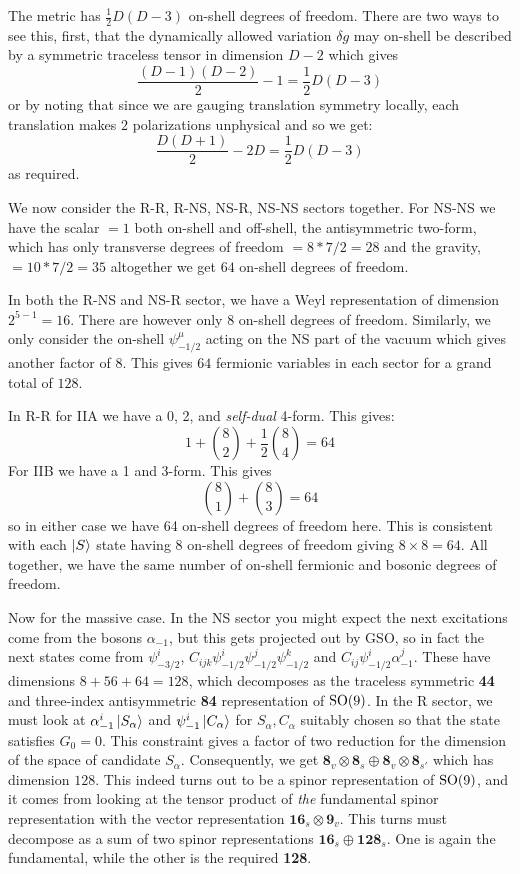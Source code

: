 \documentclass[11pt, class=article, crop=false]{standalone}
\begin{document}
\begin{enumerate}
	The metric has $\frac12 D (D-3)$ on-shell degrees of freedom. There are two ways to see this, first, that the dynamically allowed variation $\delta g$ may on-shell be described by a symmetric traceless tensor in dimension $D-2$ which gives
	\[
		\frac{(D-1)(D-2)}{2} - 1 = \frac12 D (D-3)
	\]
	or by noting that since we are gauging translation symmetry locally, each translation makes $2$ polarizations unphysical and so we get:
	\[
		\frac{D(D+1)}{2} - 2 D = \frac12 D (D-3)
	\]
	as required.
	
	We now consider the R-R, R-NS, NS-R, NS-NS sectors together. For NS-NS we have the scalar $=1$ both on-shell and off-shell, the antisymmetric two-form, which has only transverse degrees of freedom $=8 * 7/2 = 28$ and the gravity, $= 10 * 7/2 = 35$ altogether we get $64$ on-shell degrees of freedom.

	In both the R-NS and NS-R sector, we have a Weyl representation of dimension $2^{5-1} = 16$. There are however only $8$ on-shell degrees of freedom. Similarly, we only consider the on-shell $\psi^\mu_{-1/2}$ acting on the NS part of the vacuum which gives another factor of $8$. This gives $64$ fermionic variables in each sector for a grand total of $128$.

	In R-R for IIA we have a 0, 2, and \emph{self-dual} 4-form. This gives:
	\[
	1 + {8 \choose 2} + \frac12 {8 \choose 4} = 64
	\]
	For IIB we have a 1 and 3-form. This gives
	\[
	{8 \choose 1} + {8 \choose 3} = 64
	\]
	so in either case we have 64 on-shell degrees of freedom here. This is consistent with each $\ket{S}$ state having $8$ on-shell degrees of freedom giving $8 \times 8 = 64$. All together, we have the same number of on-shell fermionic and bosonic degrees of freedom. 

	Now for the massive case. In the NS sector you might expect the next excitations come from the bosons $\alpha_{-1}$, but this gets projected out by GSO, so in fact the next states come from $\psi_{-3/2}^i$, $C_{ijk} \psi_{-1/2}^i \psi_{-1/2}^j \psi_{-1/2}^k$ and $C_{ij} \psi_{-1/2}^i \alpha_{-1}^j$. These have dimensions $8+56+64 = 128$, which decomposes as the traceless symmetric \textbf{44} and three-index antisymmetric \textbf{84} representation of $\mathrm{SO}(9)$. In the R sector, we must look at $\alpha_{-1}^i \ket{S_\alpha}$ and $\psi_{-1}^i \ket{C_\alpha}$ for $S_\alpha, C_\alpha$ suitably chosen so that the state satisfies $G_0 = 0$. This constraint gives a factor of two reduction for the dimension of the space of candidate $S_\alpha$. Consequently, we get $\mathbf{8}_v \otimes \mathbf{8}_s \oplus \mathbf{8}_v \otimes \mathbf{8}_{s'}$ which has dimension $128$. This indeed turns out to be a spinor representation of $\mathrm{SO}(9)$, and it comes from looking at the tensor product of \emph{the} fundamental spinor representation with the vector representation $\mathbf{16}_s \otimes \mathbf{9}_v$. This turns must decompose as a sum of two spinor representations $\mathbf{16}_s \oplus \mathbf{128}_s$. One is again the fundamental, while the other is the required \textbf{128}. 
	

\end{enumerate}
\end{document}
